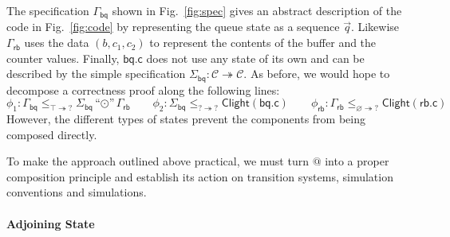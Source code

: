 \documentclass[acmsmall,screen,review,anonymous]{acmart}
\newcommand{\kw}[1]{\ensuremath{ \mathsf{#1} }}
\begin{document}
\begin{example} \label{ex:abspec} %
The specification $\Gamma_\kw{bq}$ shown in Fig.~\ref{fig:spec}
gives an abstract description of the code in Fig.~\ref{fig:code}
by representing the queue state as a sequence $\vec{q}$.
Likewise $\Gamma_\kw{rb}$ uses the data $(b, c_1, c_2)$
to represent the contents of the buffer and the counter values.
Finally,
$\kw{bq.c}$ does not use any state of its own
and can be described by the simple 
specification
$
  \Sigma_\kw{bq} : \mathcal{C} \twoheadrightarrow \mathcal{C}
$.
%
As before,
we would hope to decompose a correctness proof
along the following lines:
\[
    \phi_1 : \Gamma_\kw{bq}
      \le_{\top \twoheadrightarrow ?}
      \Sigma_\kw{bq} \! \mathbin{\text{``}{\odot}\text{''}} \Gamma_\kw{rb}
    \qquad
    \phi_2 : \Sigma_\kw{bq}
      \le_{? \twoheadrightarrow ?}
      \kw{Clight}(\kw{bq.c})
    \qquad
    \phi_\kw{rb} : \Gamma_\kw{rb}
      \le_{\varnothing \twoheadrightarrow ?}
      \kw{Clight}(\kw{rb.c})
\]
However, the different types of states
prevent the components
from being composed directly.
\end{example}

To make the approach outlined above practical,
we must turn $@$ into a proper composition principle
and establish its action on
transition systems,
simulation conventions and
simulations.


\paragraph{Adjoining State} \label{sec:overview:slift} %
\end{document}
